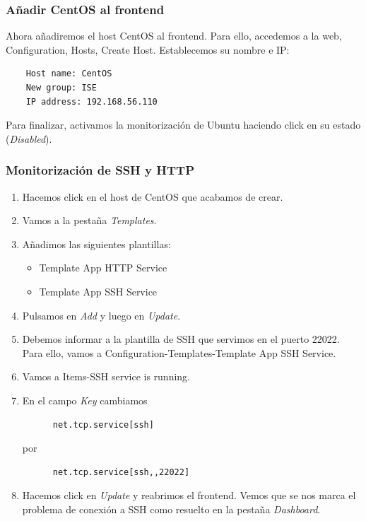 \documentclass[12pt,spanish]{article}
\begin{document}
\subsubsection{Añadir CentOS al frontend}

Ahora añadiremos el host CentOS al frontend. Para ello, accedemos a la web, Configuration, Hosts, Create Host. Establecemos su nombre e IP:
\begin{lstlisting}
    Host name: CentOS
    New group: ISE
    IP address: 192.168.56.110
\end{lstlisting}

Para finalizar, activamos la monitorización de Ubuntu haciendo click en su estado (\textit{Disabled}).

\subsubsection{Monitorización de SSH y HTTP}

\begin{enumerate}
  \item Hacemos click en el host de CentOS que acabamos de crear.
  \item Vamos a la pestaña \textit{Templates}.
  \item Añadimos las siguientes plantillas:
  \begin{itemize}
    \item Template App HTTP Service
    \item Template App SSH Service
  \end{itemize}
  \item Pulsamos en \textit{Add} y luego en \textit{Update}.
  \item Debemos informar a la plantilla de SSH que servimos en el puerto 22022. Para ello, vamos a Configuration-Templates-Template App SSH Service.
  \item Vamos a Items-SSH service is running.
  \item En el campo \textit{Key} cambiamos
  \begin{lstlisting}
      net.tcp.service[ssh]
  \end{lstlisting}
  por
  \begin{lstlisting}
      net.tcp.service[ssh,,22022]
  \end{lstlisting}
  \item Hacemos click en \textit{Update} y reabrimos el frontend. Vemos que se nos marca el problema de conexión a SSH como resuelto en la pestaña \textit{Dashboard}.
\end{enumerate}
\end{document}
